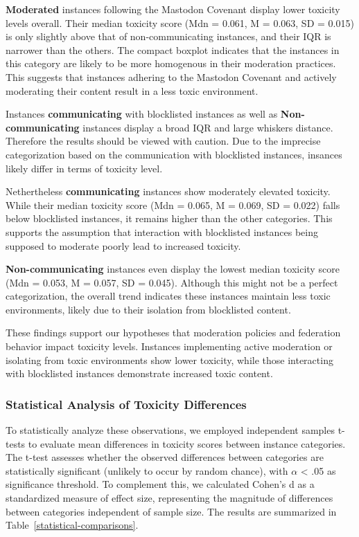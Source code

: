 \textbf{Moderated} instances following the Mastodon Covenant display lower toxicity levels overall. Their median toxicity score (Mdn = 0.061, M = 0.063, SD = 0.015) is only slightly above that of non-communicating instances, and their IQR is narrower than the others. The compact boxplot indicates that the instances in this category are likely to be more homogenous in their moderation practices. This suggests that instances adhering to the Mastodon Covenant and actively moderating their content result in a less toxic environment.

Instances \textbf{communicating} with blocklisted instances as well as \textbf{Non-communicating} instances display a broad IQR and large whiskers distance. Therefore the results should be viewed with caution. Due to the imprecise categorization based on the communication with blocklisted instances, insances likely differ in terms of toxicity level.

Nethertheless \textbf{communicating} instances show moderately elevated toxicity. While their median toxicity score (Mdn = 0.065, M = 0.069, SD = 0.022) falls below blocklisted instances, it remains higher than the other categories. This supports the assumption that interaction with blocklisted instances being supposed to moderate poorly lead to increased toxicity. 

\textbf{Non-communicating} instances even display the lowest median toxicity score (Mdn = 0.053, M = 0.057, SD = 0.045). Although this might not be a perfect categorization, the overall trend indicates these instances maintain less toxic environments, likely due to their isolation from blocklisted content.

These findings support our hypotheses that moderation policies and federation behavior impact toxicity levels. Instances implementing active moderation or isolating from toxic environments show lower toxicity, while those interacting with blocklisted instances demonstrate increased toxic content.

\subsubsection{Statistical Analysis of Toxicity Differences}
To statistically analyze these observations, we employed independent samples t-tests to evaluate mean differences in toxicity scores between instance categories. The t-test assesses whether the observed differences between categories are statistically significant (unlikely to occur by random chance), with $\alpha$ < .05 as significance threshold. To complement this, we calculated Cohen's d as a standardized measure of effect size, representing the magnitude of differences between categories independent of sample size. The results are summarized in Table~\ref{statistical-comparisons}.


